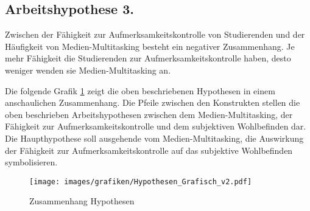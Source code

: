 \subsection{Arbeitshypothese 3.} Zwischen der Fähigkeit zur Aufmerksamkeitskontrolle von Studierenden und der Häufigkeit von Medien-Multitasking besteht ein negativer Zusammenhang. Je mehr Fähigkeit die Studierenden zur Aufmerksamkeitskontrolle haben, desto weniger wenden sie Medien-Multitasking an.
\par
Die folgende Grafik \ref{pic.einleitung.hypothesen} zeigt die oben beschriebenen Hypothesen in einem anschaulichen Zusammenhang. Die Pfeile zwischen den Konstrukten stellen die oben beschrieben Arbeitshypothesen zwischen dem Medien-Multitasking, der Fähigkeit zur Aufmerksamkeitskontrolle und dem subjektiven Wohlbefinden dar. Die Haupthypothese soll ausgehende vom Medien-Multitasking, die Auswirkung der Fähigkeit zur Aufmerksamkeitskontrolle auf das subjektive Wohlbefinden symbolisieren.
\begin{figure}[ht]
    \centering
    \texttt{[image: images/grafiken/Hypothesen\_Grafisch\_v2.pdf]}
     \caption{Zusammenhang Hypothesen}
     \label{pic.einleitung.hypothesen}
\end{figure}




